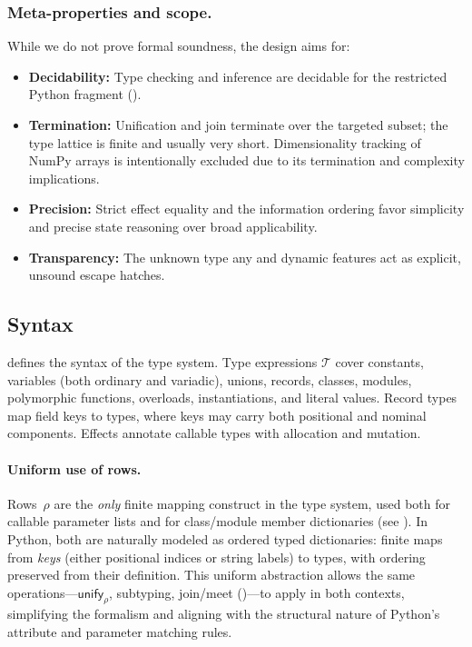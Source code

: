 \subsubsection*{Meta-properties and scope.}
While we do not prove formal soundness, the design aims for:
\begin{itemize}
  \item \textbf{Decidability:} Type checking and inference are decidable for the restricted Python fragment ().
  \item \textbf{Termination:} Unification and join terminate over the targeted subset; the type lattice is finite and usually very short. Dimensionality tracking of NumPy arrays is intentionally excluded due to its termination and complexity implications.
  \item \textbf{Precision:} Strict effect equality and the information ordering favor simplicity and precise state reasoning over broad applicability.
  \item \textbf{Transparency:} The unknown type \textsf{any} and dynamic features act as explicit, unsound escape hatches.
\end{itemize}

\subsection{Syntax}
 defines the syntax of the type system. Type expressions $\mathcal{T}$ cover constants, variables (both ordinary and variadic), unions, records, classes, modules, polymorphic functions, overloads, instantiations, and literal values.  
Record types map field keys to types, where keys may carry both positional and nominal components.  
Effects annotate callable types with allocation and mutation.

\paragraph{Uniform use of rows.}
Rows~$\rho$ are the \emph{only} finite mapping construct in the type system, used both for
callable parameter lists and for class/module member dictionaries (see ).  
In Python, both are naturally modeled as ordered typed dictionaries: finite maps from
\emph{keys} (either positional indices or string labels) to types, with ordering
preserved from their definition.  
This uniform abstraction allows the same operations---$\mathsf{unify}_{\rho}$, subtyping, join/meet ()---to apply in both contexts,  
simplifying the formalism and aligning with the structural nature of Python's
attribute and parameter matching rules.

